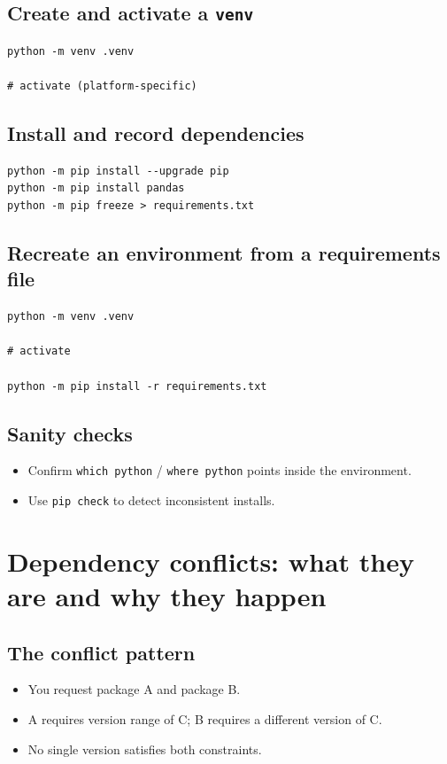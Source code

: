 \subsection{Create and activate a \texttt{venv}}
\begin{verbatim}
python -m venv .venv

# activate (platform-specific)

\end{verbatim}

\subsection{Install and record dependencies}
\begin{verbatim}
python -m pip install --upgrade pip
python -m pip install pandas
python -m pip freeze > requirements.txt
\end{verbatim}

\subsection{Recreate an environment from a requirements file}
\begin{verbatim}
python -m venv .venv

# activate

python -m pip install -r requirements.txt
\end{verbatim}

\subsection{Sanity checks}
\begin{itemize}
\item Confirm \texttt{which python} / \texttt{where python} points inside the environment.
\item Use \texttt{pip check} to detect inconsistent installs.
\end{itemize}

\section{Dependency conflicts: what they are and why they happen}
\subsection{The conflict pattern}
\begin{itemize}
\item You request package A and package B.
\item A requires version range of C; B requires a different version of C.
\item No single version satisfies both constraints.
\end{itemize}

